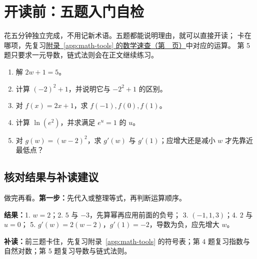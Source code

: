 \Needspace{.3\textheight}
\section*{开读前：五题入门自检}
\label{app:math-entry}
\begingroup\small
\setlength{\parskip}{3pt}
花五分钟独立完成，不用记新术语。五题都能说明理由，就可以直接开读；
卡在哪项，先复习\hyperref[app:math-tools]{附录~\ref*{app:math-tools} 的数学速查（第~\pageref*{app:math-tools}~页）}中对应的运算。
第 5 题只要求一元导数，链式法则会在正文继续练习。
\begin{enumerate}[itemsep=1pt,topsep=2pt]
\item 解 $2w+1=5$。
\item 计算 $(-2)^2+1$，并说明它与 $-2^2+1$ 的区别。
\item 对 $f(x)=2x+1$，求 $f(-1),f(0),f(1)$。
\item 计算 $\ln(e^2)$，并求满足 $e^u=1$ 的 $u$。
\item 对 $g(w)=(w-2)^2$，求 $g'(w)$ 与 $g'(1)$；应增大还是减小 $w$ 才先靠近最低点？
\end{enumerate}

\subsection*{核对结果与补读建议}
\label{answer:math-entry}
做完再看。\textbf{第一步：}先代入或整理等式，再判断运算顺序。\par\nobreak
\textbf{结果：}1. $w=2$；2. $5$ 与 $-3$，先算幂再应用前面的负号；
3. $(-1,1,3)$；4. $2$ 与 $u=0$；
5. $g'(w)=2(w-2)$，$g'(1)=-2$，导数为负，应先增大 $w$。\par
\textbf{补读：}前三题卡住，先复习附录~\ref*{app:math-tools} 的符号表；第 4 题复习指数与自然对数；第 5 题复习导数与链式法则。
\endgroup
